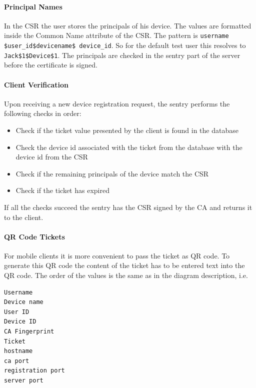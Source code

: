 \documentclass{memoir}
\begin{document}
\paragraph{Principal Names}

In the CSR the user stores the principals of his device. The values are formatted inside the Common Name attribute of the CSR. The pattern is \texttt{username \$user\_id\$devicename\$ device\_id}. So for the default test user this resolves to \texttt{Jack\$1\$Device\$1}. The principals are checked in the sentry part of the server before the certificate is signed.

\paragraph{Client Verification}

Upon receiving a new device registration request, the sentry performs the following checks in order:

\begin{itemize}
\item Check if the ticket value presented by the client is found in the database

\item Check the device id associated with the ticket from the database with the device id from the CSR

\item Check if the remaining principals of the device match the CSR

\item Check if the ticket has expired
\end{itemize}

If all the checks succeed the sentry has the CSR signed by the CA and returns it to the client.

\paragraph{QR Code Tickets}

For mobile clients it is more convenient to pass the ticket as QR code. To generate this QR code the content of the ticket has to be entered text into the QR code. The order of the values is the same as in the diagram description, i.e.

\begin{lstlisting}
Username
Device name
User ID
Device ID
CA Fingerprint
Ticket
hostname
ca port
registration port
server port
\end{lstlisting}
\end{document}

